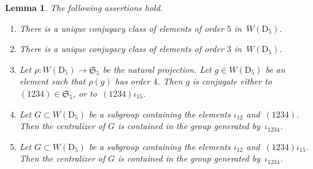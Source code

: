 \documentclass[12pt]{amsart}
\newcounter{cequation}[section]
\newtheorem{lemma}[cequation]{Lemma}
\theoremstyle{definition}
\theoremstyle{remark}
\renewcommand\labelenumi{(\arabic{enumi})}
\begin{document}
\begin{lemma}\label{lemma:WD5}
The following assertions hold.


\begin{enumerate}
\renewcommand\labelenumi{\rm (\roman{enumi})}
\renewcommand\theenumi{\rm (\roman{enumi})}

\item\label{lemma:WD55}
There is a unique conjugacy class of elements of order $5$ in~$W(\mathrm{D}_5)$.

\item\label{lemma:WD53}   There is a unique conjugacy class of elements of order $3$ in~$W(\mathrm{D}_5)$.

\item\label{lemma:WD5-1234}
Let $\rho\colon W(\mathrm{D}_5)\to \mathfrak{S}_5$
be the natural projection. Let $g \in W(\mathrm{D}_5)$ be an element such that
$\rho(g)$ has order $4$.
Then $g$ is conjugate either to $(1234)\in\mathfrak{S}_5$, or to~\mbox{$(1234)\iota_{15}$}.

\item\label{lemma:WD5involutions}    Let $G\subset W(\mathrm{D}_5)$ be a subgroup containing the elements
$\iota_{12}$ and~\mbox{$(1234)$}.
Then the centralizer of $G$ is contained in the group
generated by~$\iota_{1234}$.


\item\label{lemma:WD5involutions15}
Let $G\subset W(\mathrm{D}_5)$ be a subgroup containing the elements
$\iota_{12}$ and~\mbox{$(1234)\iota_{15}$}.
Then the centralizer of $G$ is contained in the group
generated by~$\iota_{1234}$.
\end{enumerate}
\end{lemma}
\end{document}
